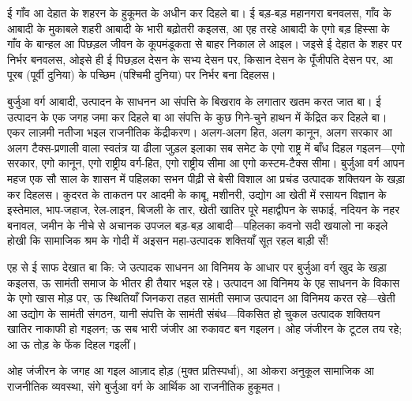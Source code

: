 \documentclass[12pt,a4paper,oneside]{book}
\begin{document}
ई गाँव आ देहात के शहरन के हुकूमत के अधीन कर दिहले बा। ई बड़-बड़ महानगरा बनवलस, गाँव के आबादी के मुकाबले शहरी आबादी के भारी बढ़ोतरी कइलस, आ एह तरहे आबादी के एगो बड़ हिस्सा के गाँव के बान्हल आ पिछड़ल जीवन के कूपमंडूकता से बाहर निकाल ले आइल। जइसे ई देहात के शहर पर निर्भर बनवलस, ओइसे ही ई पिछड़ल देसन के सभ्य देसन पर, किसान देसन के पूँजीपति देसन पर, आ पूरब (पूर्वी दुनिया) के पच्छिम (पश्चिमी दुनिया) पर निर्भर बना दिहलस।

बुर्जुआ वर्ग आबादी, उत्पादन के साधनन आ संपत्ति के बिखराव के लगातार खतम करत जात बा। ई उत्पादन के एक जगह जमा कर दिहले बा आ संपत्ति के कुछ गिने-चुने हाथन में केंद्रित कर दिहले बा। एकर लाज़मी नतीजा भइल राजनीतिक केंद्रीकरण। अलग-अलग हित, अलग कानून, अलग सरकार आ अलग टैक्स-प्रणाली वाला स्वतंत्र या ढीला जुड़ल इलाका सब समेट के एगो राष्ट्र में बाँध दिहल गइलन—एगो सरकार, एगो कानून, एगो राष्ट्रीय वर्ग-हित, एगो राष्ट्रीय सीमा आ एगो कस्टम-टैक्स सीमा। बुर्जुआ वर्ग आपन महज एक सौ साल के शासन में पहिलका सभन पीढ़ी से बेसी विशाल आ प्रचंड उत्पादक शक्तियन के खड़ा कर दिहलस। कुदरत के ताकतन पर आदमी के काबू, मशीनरी, उद्योग आ खेती में रसायन विज्ञान के इस्तेमाल, भाप-जहाज, रेल-लाइन, बिजली के तार, खेती खातिर पूरे महाद्वीपन के सफाई, नदियन के नहर बनावल, जमीन के नीचे से अचानक उपजल बड़-बड़ आबादी—पहिलका कवनो सदी खयालो ना कइले होखी कि सामाजिक श्रम के गोदी में अइसन महा-उत्पादक शक्तियाँ सूत रहल बाड़ी सँ!

एह से ई साफ देखात बा कि: जे उत्पादक साधनन आ विनिमय के आधार पर बुर्जुआ वर्ग खुद के खड़ा कइलस, ऊ सामंती समाज के भीतर ही तैयार भइल रहे। उत्पादन आ विनिमय के एह साधनन के विकास के एगो खास मोड़ पर, ऊ स्थितियाँ जिनकरा तहत सामंती समाज उत्पादन आ विनिमय करत रहे—खेती आ उद्योग के सामंती संगठन, यानी संपत्ति के सामंती संबंध—विकसित हो चुकल उत्पादक शक्तियन खातिर नाकाफी हो गइलन; ऊ सब भारी जंजीर आ रुकावट बन गइलन। ओह जंजीरन के टूटल तय रहे; आ ऊ तोड़ के फेंक दिहल गइलीं।

ओह जंजीरन के जगह आ गइल आज़ाद होड़ (मुक्त प्रतिस्पर्धा), आ ओकरा अनुकूल सामाजिक आ राजनीतिक व्यवस्था, संगे बुर्जुआ वर्ग के आर्थिक आ राजनीतिक हुकूमत।
\end{document}
